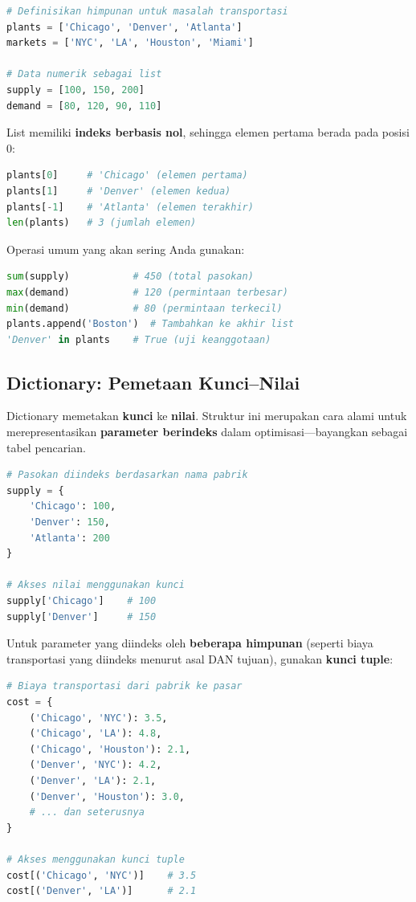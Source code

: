\begin{lstlisting}[language=Python]
# Definisikan himpunan untuk masalah transportasi
plants = ['Chicago', 'Denver', 'Atlanta']
markets = ['NYC', 'LA', 'Houston', 'Miami']

# Data numerik sebagai list
supply = [100, 150, 200]
demand = [80, 120, 90, 110]
\end{lstlisting}

List memiliki \textbf{indeks berbasis nol}, sehingga elemen pertama berada pada posisi 0:

\begin{lstlisting}[language=Python]
plants[0]     # 'Chicago' (elemen pertama)
plants[1]     # 'Denver' (elemen kedua)
plants[-1]    # 'Atlanta' (elemen terakhir)
len(plants)   # 3 (jumlah elemen)
\end{lstlisting}

Operasi umum yang akan sering Anda gunakan:

\begin{lstlisting}[language=Python]
sum(supply)           # 450 (total pasokan)
max(demand)           # 120 (permintaan terbesar)
min(demand)           # 80 (permintaan terkecil)
plants.append('Boston')  # Tambahkan ke akhir list
'Denver' in plants    # True (uji keanggotaan)
\end{lstlisting}

\subsection{Dictionary: Pemetaan Kunci--Nilai}

Dictionary memetakan \textbf{kunci} ke \textbf{nilai}. Struktur ini merupakan cara alami untuk merepresentasikan \textbf{parameter berindeks} dalam optimisasi---bayangkan sebagai tabel pencarian.

\begin{lstlisting}[language=Python]
# Pasokan diindeks berdasarkan nama pabrik
supply = {
    'Chicago': 100,
    'Denver': 150,
    'Atlanta': 200
}

# Akses nilai menggunakan kunci
supply['Chicago']    # 100
supply['Denver']     # 150
\end{lstlisting}

Untuk parameter yang diindeks oleh \textbf{beberapa himpunan} (seperti biaya transportasi yang diindeks menurut asal DAN tujuan), gunakan \textbf{kunci tuple}:

\begin{lstlisting}[language=Python]
# Biaya transportasi dari pabrik ke pasar
cost = {
    ('Chicago', 'NYC'): 3.5,
    ('Chicago', 'LA'): 4.8,
    ('Chicago', 'Houston'): 2.1,
    ('Denver', 'NYC'): 4.2,
    ('Denver', 'LA'): 2.1,
    ('Denver', 'Houston'): 3.0,
    # ... dan seterusnya
}

# Akses menggunakan kunci tuple
cost[('Chicago', 'NYC')]    # 3.5
cost[('Denver', 'LA')]      # 2.1
\end{lstlisting}

